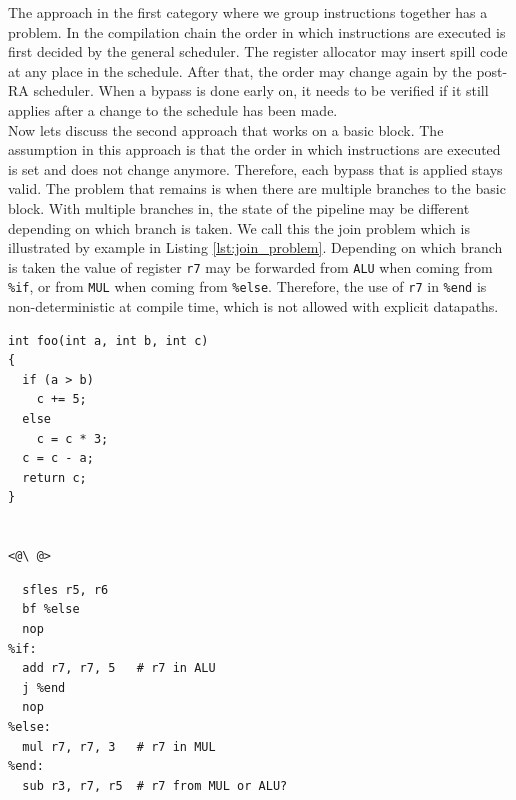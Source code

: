 The approach in the first category where we group instructions together has a problem. In the compilation chain the order in which instructions are executed is first decided by the general scheduler. The register allocator may insert spill code at any place in the schedule. After that, the order may change again by the post-RA scheduler. When a bypass is done early on, it needs to be verified if it still applies after a change to the schedule has been made.\\


Now lets discuss the second approach that works on a basic block. The assumption in this approach is that the order in which instructions are executed is set and does not change anymore. Therefore, each bypass that is applied stays valid. The problem that remains is when there are multiple branches to the basic block. With multiple branches in, the state of the pipeline may be different depending on which branch is taken. We call this the join problem which is illustrated by example in Listing \ref{lst:join_problem}. Depending on which branch is taken the value of register \texttt{r7} may be forwarded from \texttt{ALU} when coming from \texttt{\%if}, or from \texttt{MUL} when coming from \texttt{\%else}. Therefore, the use of \texttt{r7} in \texttt{\%end} is non-deterministic at compile time, which is not allowed with explicit datapaths. 


\label{lst:join_problem}
\begin{center}
\hspace{2px}\begin{minipage}{.475\textwidth}
\lstset{style=customc}
\begin{lstlisting}[frame=tlrb]
int foo(int a, int b, int c)
{
  if (a > b)
    c += 5;
  else
    c = c * 3;
  c = c - a;
  return c;
}


<@\ @>
\end{lstlisting}
\end{minipage}\hfill
\begin{minipage}{.475\textwidth}
\lstset{style=customasm}
\begin{lstlisting}[frame=tlrb]
%foo: # a = r5, b = r6 and c = r7
  sfles r5, r6
  bf %else
  nop
%if:
  add r7, r7, 5   # r7 in ALU
  j %end
  nop
%else:
  mul r7, r7, 3   # r7 in MUL 
%end:
  sub r3, r7, r5  # r7 from MUL or ALU?
\end{lstlisting}
\end{minipage}
\end{center}

